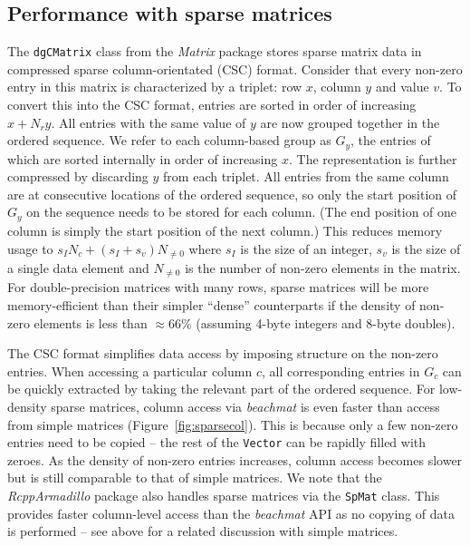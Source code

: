 \documentclass[10pt,letterpaper]{article}
\newcommand{\beachmat}{\textit{beachmat}}
\newcommand{\code}[1]{\texttt{#1}}
\begin{document}
\subsection*{Performance with sparse matrices}
The \code{dgCMatrix} class from the \textit{Matrix} package stores sparse matrix data in compressed sparse column-orientated (CSC) format.
Consider that every non-zero entry in this matrix is characterized by a triplet: row $x$, column $y$ and value $v$.
To convert this into the CSC format, entries are sorted in order of increasing $x + N_ry$.
All entries with the same value of $y$ are now grouped together in the ordered sequence.
We refer to each column-based group as $G_y$, the entries of which are sorted internally in order of increasing $x$.
The representation is further compressed by discarding $y$ from each triplet.
All entries from the same column are at consecutive locations of the ordered sequence, so only the start position of $G_y$ on the sequence needs to be stored for each column.
(The end position of one column is simply the start position of the next column.)
This reduces memory usage to $s_IN_c + (s_I + s_v) N_{\ne 0}$ where $s_I$ is the size of an integer, $s_v$ is the size of a single data element and $N_{\ne 0}$ is the number of non-zero elements in the matrix.
For double-precision matrices with many rows, sparse matrices will be more memory-efficient than their simpler ``dense'' counterparts if the density of non-zero elements is less than $\approx66$\% (assuming 4-byte integers and 8-byte doubles). 


The CSC format simplifies data access by imposing structure on the non-zero entries.
When accessing a particular column $c$, all corresponding entries in $G_c$ can be quickly extracted by taking the relevant part of the ordered sequence.
For low-density sparse matrices, column access via \beachmat{} is even faster than access from simple matrices (Figure~\ref{fig:sparsecol}).
This is because only a few non-zero entries need to be copied -- the rest of the \code{Vector} can be rapidly filled with zeroes.
As the density of non-zero entries increases, column access becomes slower but is still comparable to that of simple matrices.
We note that the \textit{RcppArmadillo} package \cite{eddelbuettel2014arma} also handles sparse matrices via the \code{SpMat} class.
This provides faster column-level access than the \beachmat{} API as no copying of data is performed -- see above for a related discussion with simple matrices.
\end{document}
